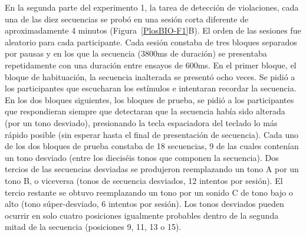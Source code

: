 En la segunda parte del experimento 1, la tarea de detección de violaciones, cada una de las diez secuencias se probó en una sesión corta diferente de aproximadamente 4 minutos (Figura~\ref{PlosBIO-F1}B). El orden de las sesiones fue aleatorio para cada participante. Cada sesión constaba de tres bloques separados por pausas y en los que la secuencia (3800ms de duración) se presentaba repetidamente con una duración entre ensayos de 600ms. En el primer bloque, el bloque de habituación, la secuencia inalterada se presentó ocho veces. Se pidió a los participantes que escucharan los estímulos e intentaran recordar la secuencia. En los dos bloques siguientes, los bloques de prueba, se pidió a los participantes que respondieran siempre que detectaran que la secuencia había sido alterada (por un tono desviado), presionando la tecla espaciadora del teclado lo más rápido posible (sin esperar hasta el final de presentación de secuencia). Cada uno de los dos bloques de prueba constaba de 18 secuencias, 9 de las cuales contenían un tono desviado (entre los dieciséis tonos que componen la secuencia). Dos tercios de las secuencias desviadas se produjeron reemplazando un tono A por un tono B, o viceversa (tonos de secuencia desviados, 12 intentos por sesión). El tercio restante se obtuvo reemplazando un tono por un sonido C de tono bajo o alto (tono súper-desviado, 6 intentos por sesión). Los tonos desviados pueden ocurrir en solo cuatro posiciones igualmente probables dentro de la segunda mitad de la secuencia (posiciones 9, 11, 13 o 15).


